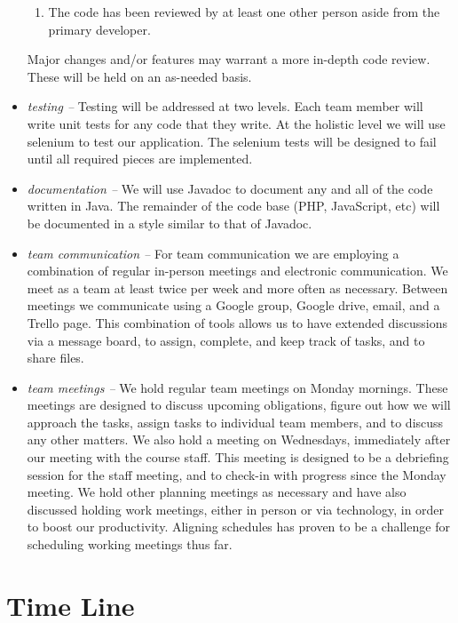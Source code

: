 \documentclass{extarticle}
\begin{document}
\begin{itemize}
\begin{enumerate}
    \item The code has been reviewed by at least one other person aside from the primary developer.
\end{enumerate}
Major changes and/or features may warrant a more in-depth code review. These will be held on an as-needed basis.
\item \emph{testing -- }Testing will be addressed at two levels.  Each team member will write unit tests for any
code that they write.  At the holistic level we will use selenium to test our application.  The selenium tests will
be designed to fail until all required pieces are implemented.
\item \emph{documentation -- }We will use Javadoc to document any and all of the code written in Java.  The
remainder of the code base (PHP, JavaScript, etc) will be documented in a style similar to that of Javadoc.
\item \emph{team communication -- }For team communication we are employing a combination of regular in-person
meetings and electronic communication.  We meet as a team at least twice per week and more often as necessary.
Between meetings we communicate using a Google group, Google drive, email, and a Trello page.  This combination of
tools allows us to have extended discussions via a message board, to assign, complete, and keep track of tasks,
and to share files.
\item \emph{team meetings -- }We hold regular team meetings on Monday mornings.  These meetings are designed to
discuss upcoming obligations, figure out how we will approach the tasks, assign tasks to individual team members,
and to discuss any other matters.  We also hold a meeting on Wednesdays, immediately after our meeting with the
course staff. This meeting is designed to be a debriefing session for the staff meeting, and to check-in with
progress since the Monday meeting.  We hold other planning meetings as necessary and have also discussed holding
work meetings, either in person or via technology, in order to boost our productivity.  Aligning schedules has
proven to be a challenge for scheduling working meetings thus far.
\end{itemize}

\section{Time Line}

\end{document}
